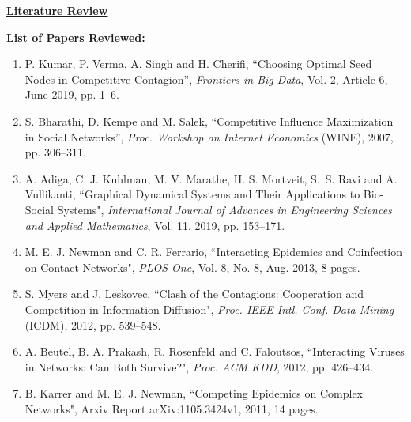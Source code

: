 \documentclass[11pt]{article}
\begin{document}
\newtheorem{theorem}{Theorem}[section]
\newtheorem{lemma}{Lemma}[section]
\newtheorem{corollary}{Corollary}[section]
\newtheorem{fact}{Fact}[section]
\newtheorem{definition}{Definition}[section]
\newtheorem{proposition}{Proposition}[section]
\newtheorem{observation}{Observation}[section]
\newtheorem{claim}{Claim}[section]

\newcommand{\cnp}{\textbf{NP}}
\newcommand{\true}{\texttt{True}}
\newcommand{\false}{\texttt{False}}

\newcommand{\QED}{\hfill\rule{2mm}{2mm}}

\newcommand{\irange}{\mbox{$1 \leq i \leq n$}}
\newcommand{\jrange}{\mbox{$1 \leq j \leq m$}}

\newcommand{\dunder}[1]{\underline{\underline{#1}}}

\setlength{\parskip}{3pt}

\normalbaselineskip

\begin{center}
\dunder{\Large{\textbf{Literature Review}}}
\end{center}

\bigskip

\noindent
\textbf{List of Papers Reviewed:}

\begin{enumerate}
\item   P. Kumar, P. Verma, A. Singh and H. Cherifi,
``Choosing Optimal Seed Nodes in Competitive Contagion”, 
\emph{Frontiers in Big Data}, Vol. 2, Article 6, June 2019, pp. 1--6.

\item S. Bharathi, D. Kempe and M. Salek, ``Competitive Influence 
Maximization in Social Networks”, \emph{Proc. Workshop on Internet Economics}
(WINE), 2007, pp. 306--311.

\item A. Adiga, C. J. Kuhlman, M. V. Marathe, H. S. Mortveit, 
S.~S. Ravi and A. Vullikanti, ``Graphical Dynamical Systems and Their
Applications to Bio-Social Systems", \emph{International Journal of Advances
in Engineering Sciences and Applied Mathematics}, Vol. 11, 2019, pp. 153--171.

\item M. E. J. Newman and C. R. Ferrario, ``Interacting Epidemics and 
Coinfection on Contact Networks", \emph{PLOS One}, Vol. 8, No. 8, Aug. 2013,
8 pages.

\item S. Myers and J. Leskovec, ``Clash of the Contagions: Cooperation and 
Competition in Information Diffusion", \emph{Proc. IEEE Intl. Conf. Data Mining}
(ICDM), 2012, pp. 539--548.

\item A. Beutel, B. A. Prakash, R. Rosenfeld and C. Faloutsos,
``Interacting Viruses in Networks: Can Both Survive?", 
\emph{Proc. ACM KDD}, 2012, pp. 426--434.

\item B. Karrer and M. E. J. Newman, ``Competing Epidemics on Complex Networks",
Arxiv Report arXiv:1105.3424v1, 2011, 14 pages.
\end{enumerate}
\end{document}
